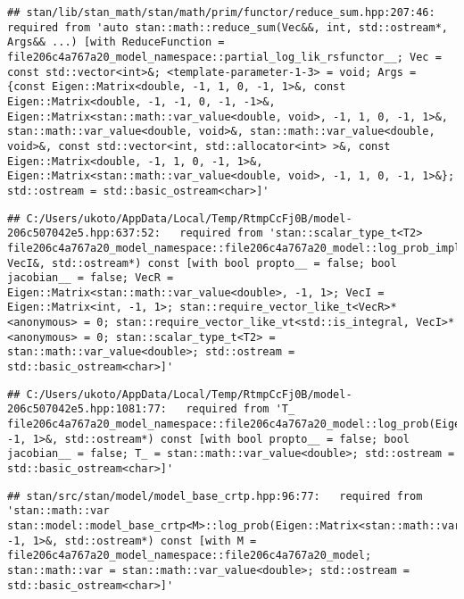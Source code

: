 \documentclass[
]{article}
\begin{document}
\begin{verbatim}
## stan/lib/stan_math/stan/math/prim/functor/reduce_sum.hpp:207:46:   required from 'auto stan::math::reduce_sum(Vec&&, int, std::ostream*, Args&& ...) [with ReduceFunction = file206c4a767a20_model_namespace::partial_log_lik_rsfunctor__; Vec = const std::vector<int>&; <template-parameter-1-3> = void; Args = {const Eigen::Matrix<double, -1, 1, 0, -1, 1>&, const Eigen::Matrix<double, -1, -1, 0, -1, -1>&, Eigen::Matrix<stan::math::var_value<double, void>, -1, 1, 0, -1, 1>&, stan::math::var_value<double, void>&, stan::math::var_value<double, void>&, const std::vector<int, std::allocator<int> >&, const Eigen::Matrix<double, -1, 1, 0, -1, 1>&, Eigen::Matrix<stan::math::var_value<double, void>, -1, 1, 0, -1, 1>&}; std::ostream = std::basic_ostream<char>]'
\end{verbatim}

\begin{verbatim}
## C:/Users/ukoto/AppData/Local/Temp/RtmpCcFj0B/model-206c507042e5.hpp:637:52:   required from 'stan::scalar_type_t<T2> file206c4a767a20_model_namespace::file206c4a767a20_model::log_prob_impl(VecR&, VecI&, std::ostream*) const [with bool propto__ = false; bool jacobian__ = false; VecR = Eigen::Matrix<stan::math::var_value<double>, -1, 1>; VecI = Eigen::Matrix<int, -1, 1>; stan::require_vector_like_t<VecR>* <anonymous> = 0; stan::require_vector_like_vt<std::is_integral, VecI>* <anonymous> = 0; stan::scalar_type_t<T2> = stan::math::var_value<double>; std::ostream = std::basic_ostream<char>]'
\end{verbatim}

\begin{verbatim}
## C:/Users/ukoto/AppData/Local/Temp/RtmpCcFj0B/model-206c507042e5.hpp:1081:77:   required from 'T_ file206c4a767a20_model_namespace::file206c4a767a20_model::log_prob(Eigen::Matrix<T_job_param, -1, 1>&, std::ostream*) const [with bool propto__ = false; bool jacobian__ = false; T_ = stan::math::var_value<double>; std::ostream = std::basic_ostream<char>]'
\end{verbatim}

\begin{verbatim}
## stan/src/stan/model/model_base_crtp.hpp:96:77:   required from 'stan::math::var stan::model::model_base_crtp<M>::log_prob(Eigen::Matrix<stan::math::var_value<double>, -1, 1>&, std::ostream*) const [with M = file206c4a767a20_model_namespace::file206c4a767a20_model; stan::math::var = stan::math::var_value<double>; std::ostream = std::basic_ostream<char>]'
\end{verbatim}
\end{document}
